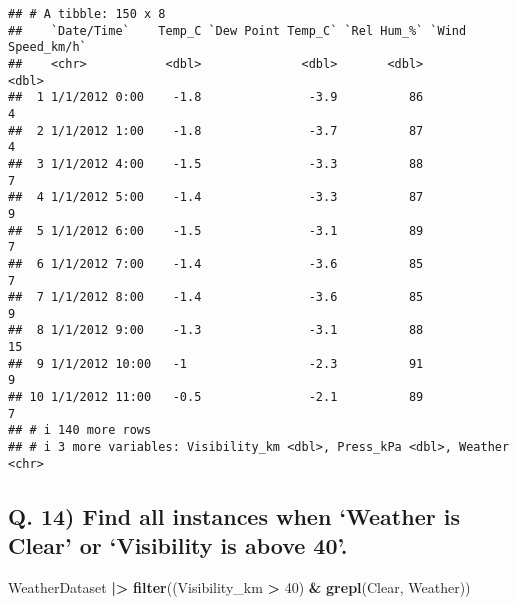\documentclass[
]{article}
\newenvironment{Shaded}{\begin{snugshade}}{\end{snugshade}}
\newcommand{\DecValTok}[1]{\textcolor[rgb]{0.00,0.00,0.81}{#1}}
\newcommand{\FunctionTok}[1]{\textcolor[rgb]{0.13,0.29,0.53}{\textbf{#1}}}
\newcommand{\NormalTok}[1]{#1}
\newcommand{\SpecialCharTok}[1]{\textcolor[rgb]{0.81,0.36,0.00}{\textbf{#1}}}
\newcommand{\StringTok}[1]{\textcolor[rgb]{0.31,0.60,0.02}{#1}}
\begin{document}
\begin{verbatim}
## # A tibble: 150 x 8
##    `Date/Time`    Temp_C `Dew Point Temp_C` `Rel Hum_%` `Wind Speed_km/h`
##    <chr>           <dbl>              <dbl>       <dbl>             <dbl>
##  1 1/1/2012 0:00    -1.8               -3.9          86                 4
##  2 1/1/2012 1:00    -1.8               -3.7          87                 4
##  3 1/1/2012 4:00    -1.5               -3.3          88                 7
##  4 1/1/2012 5:00    -1.4               -3.3          87                 9
##  5 1/1/2012 6:00    -1.5               -3.1          89                 7
##  6 1/1/2012 7:00    -1.4               -3.6          85                 7
##  7 1/1/2012 8:00    -1.4               -3.6          85                 9
##  8 1/1/2012 9:00    -1.3               -3.1          88                15
##  9 1/1/2012 10:00   -1                 -2.3          91                 9
## 10 1/1/2012 11:00   -0.5               -2.1          89                 7
## # i 140 more rows
## # i 3 more variables: Visibility_km <dbl>, Press_kPa <dbl>, Weather <chr>
\end{verbatim}

\hypertarget{q.-14-find-all-instances-when-weather-is-clear-or-visibility-is-above-40.}{%
\subsection{Q. 14) Find all instances when `Weather is Clear' or
`Visibility is above
40'.}\label{q.-14-find-all-instances-when-weather-is-clear-or-visibility-is-above-40.}}

\begin{Shaded}
\begin{Highlighting}[]
\NormalTok{WeatherDataset }\SpecialCharTok{|\textgreater{}} 
  \FunctionTok{filter}\NormalTok{((Visibility\_km }\SpecialCharTok{\textgreater{}} \DecValTok{40}\NormalTok{) }\SpecialCharTok{\&} \FunctionTok{grepl}\NormalTok{(}\StringTok{\textquotesingle{}Clear\textquotesingle{}}\NormalTok{, Weather))}
\end{Highlighting}
\end{Shaded}
\end{document}
